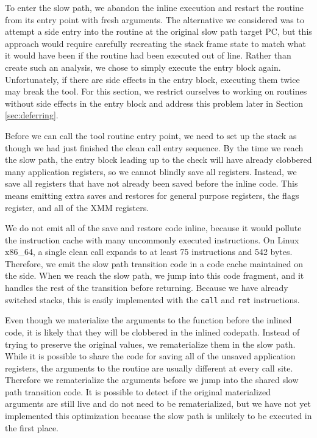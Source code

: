 To enter the slow path, we abandon the inline execution and restart the routine
from its entry point with fresh arguments.  The alternative we considered was to
attempt a side entry into the routine at the original slow path target PC, but
this approach would require carefully recreating the stack frame state to match
what it would have been if the routine had been executed out of line.  Rather
than create such an analysis, we chose to simply execute the entry block again.
Unfortunately, if there are side effects in the entry block, executing them
twice may break the tool.  For this section, we restrict ourselves to working on
routines without side effects in the entry block and address this problem later
in Section \ref{sec:deferring}.

Before we can call the tool routine entry point, we need to set up the stack as
though we had just finished the clean call entry sequence.  By the time we reach
the slow path, the entry block leading up to the check will have already
clobbered many application registers, so we cannot blindly save all registers.
Instead, we save all registers that have not already been saved before the
inline code.  This means emitting extra saves and restores for general purpose
registers, the flags register, and all of the XMM registers.

We do not emit all of the save and restore code inline, because it would pollute
the instruction cache with many uncommonly executed instructions.  On Linux
x86\_64, a single clean call expands to at least 75 instructions and 542 bytes.
Therefore, we emit the slow path transition code in a code cache maintained on
the side.  When we reach the slow path, we jump into this code fragment, and it
handles the rest of the transition before returning.  Because we have already
switched stacks, this is easily implemented with the {\tt call} and {\tt ret}
instructions.

Even though we materialize the arguments to the function before the inlined
code, it is likely that they will be clobbered in the inlined codepath.  Instead
of trying to preserve the original values, we rematerialize them in the
slow path.  While it is possible to share the code for saving all of the unsaved
application registers, the arguments to the routine are usually different at
every call site.  Therefore we rematerialize the arguments before we jump into
the shared slow path transition code.  It is possible to detect if the original
materialized arguments are still live and do not need to be rematerialized, but
we have not yet implemented this optimization because the slow path is unlikely
to be executed in the first place.

